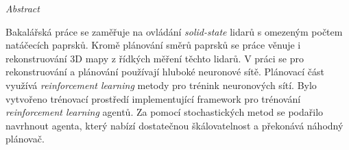 \vfill
\begin{center}
{\it \large Abstract}
\vspace{0.2cm}

\begin{minipage}{0.8\textwidth}{
Bakalářská práce se zaměřuje na ovládání \textit{solid-state} lidarů s omezeným počtem natáčecích paprsků. Kromě plánování směrů paprsků se práce věnuje i rekonstruování 3D mapy z řídkých měření těchto lidarů. V práci se pro rekonstruování a plánování používají hluboké neuronové sítě. Plánovací část využívá \textit{reinforcement learning} metody pro trénink neuronových sítí. Bylo vytvořeno trénovací prostředí implementující framework pro trénování \textit{reinforcement learning} agentů. Za pomocí stochastických metod se podařilo navrhnout agenta, který nabízí dostatečnou škálovatelnost a překonává náhodný plánovač.
}
\end{minipage}
\end{center}
\vfill
\vspace{1cm}
